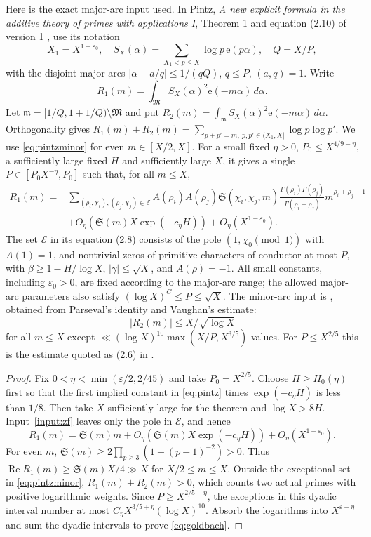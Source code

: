 \documentclass[11pt]{article}
\theoremstyle{definition}
\newcommand{\e}{\mathrm e}
\DeclareMathOperator{\Rea}{Re}
\begin{document}
Here is the exact major-arc input used. In Pintz,
\emph{A new explicit formula in the additive theory of primes with
applications I}, Theorem 1 and equation (2.10) of version 1
\cite{PintzI}, use its notation
\[
 X_1=X^{1-\varepsilon_0},\quad
 S_X(\alpha)=\sum_{X_1<p\le X}\log p\,\e(p\alpha),\quad
 Q=X/P,
\]
with the disjoint major arcs $|\alpha-a/q|\le1/(qQ)$, $q\le P$,
$(a,q)=1$. Write
\[
 R_1(m)=\int_{\mathfrak M}S_X(\alpha)^2\e(-m\alpha)\,d\alpha.
\]
Let $\mathfrak m=[1/Q,1+1/Q)\setminus\mathfrak M$ and put
$R_2(m)=\int_{\mathfrak m}S_X(\alpha)^2\e(-m\alpha)\,d\alpha$.
Orthogonality gives
$R_1(m)+R_2(m)=\sum_{p+p'=m,\ p,p'\in(X_1,X]}\log p\log p'$.
We use \eqref{eq:pintzminor} for even $m\in[X/2,X]$.
For a small fixed $\eta>0$, $P_0\le X^{4/9-\eta}$, a sufficiently
large fixed $H$ and sufficiently large $X$, it gives a single
$P\in[P_0X^{-\eta},P_0]$ such that, for all $m\le X$,
\begin{equation}\label{eq:pintz}
 \begin{split}
 R_1(m)={}&\sum_{(\rho_i,\chi_i),(\rho_j,\chi_j)\in\mathcal E}
 A(\rho_i)A(\rho_j)\mathfrak S(\chi_i,\chi_j,m)
 \frac{\Gamma(\rho_i)\Gamma(\rho_j)}{\Gamma(\rho_i+\rho_j)}
 m^{\rho_i+\rho_j-1}\\
 &+O_\eta(\mathfrak S(m)X\exp(-c_\eta H))
       +O_\eta(X^{1-\varepsilon_0}).
 \end{split}
\end{equation}
The set $\mathcal E$ in its equation (2.8) consists of the pole
$(1,\chi_0\pmod1)$ with $A(1)=1$, and nontrivial zeros of primitive
characters of conductor at most $P$, with
$\beta\ge1-H/\log X$, $|\gamma|\le\sqrt X$, and $A(\rho)=-1$.
All small constants, including $\varepsilon_0>0$, are fixed according
to the major-arc range; the allowed major-arc parameters also satisfy
$(\log X)^C\le P\le\sqrt X$.
The minor-arc input is \cite[(5.2)]{PintzI}, obtained from Parseval's
identity and Vaughan's estimate:
\begin{equation}\label{eq:pintzminor}
 |R_2(m)|\le X/\sqrt{\log X}
\end{equation}
for all $m\le X$ except
$\ll(\log X)^{10}\max(X/P,X^{3/5})$ values.
For $P\le X^{2/5}$ this is the estimate quoted as (2.6) in
\cite{PintzII}.

\begin{proof}
Fix $0<\eta<\min(\varepsilon/2,2/45)$ and take $P_0=X^{2/5}$.
Choose $H\ge H_0(\eta)$ first so that the first implied constant in \eqref{eq:pintz}
times $\exp(-c_\eta H)$ is less than $1/8$.
Then take $X$ sufficiently large for the theorem and $\log X>8H$.
Input~\ref{input:zf} leaves only the pole in $\mathcal E$, and hence
\[
 R_1(m)=\mathfrak S(m)m
   +O_\eta(\mathfrak S(m)X\exp(-c_\eta H))
   +O_\eta(X^{1-\varepsilon_0}).
\]
For even $m$,
$\mathfrak S(m)\ge2\prod_{p\ge3}(1-(p-1)^{-2})>0$.
Thus $\Rea R_1(m)\ge\mathfrak S(m)X/4\gg X$ for $X/2\le m\le X$.
Outside the exceptional set in \eqref{eq:pintzminor},
$R_1(m)+R_2(m)>0$, which counts two actual primes with positive
logarithmic weights. Since $P\ge X^{2/5-\eta}$, the exceptions in this
dyadic interval number at most
$C_\eta X^{3/5+\eta}(\log X)^{10}$.
Absorb the logarithms into $X^{\varepsilon-\eta}$ and sum the dyadic
intervals to prove \eqref{eq:goldbach}.
\end{proof}
\end{document}
